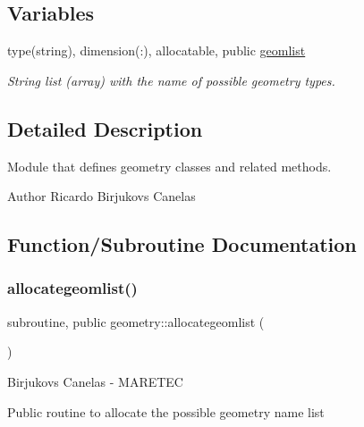 \subsection*{Variables}
\begin{DoxyCompactItemize}
\item 
type(string), dimension(\+:), allocatable, public \hyperlink{namespacegeometry_a879bd9ccab6fc42f051bbfc9f0560a62}{geomlist}
\begin{DoxyCompactList}\small\item\em String list (array) with the name of possible geometry types. \end{DoxyCompactList}\end{DoxyCompactItemize}


\subsection{Detailed Description}
Module that defines geometry classes and related methods. 

\begin{DoxyAuthor}{Author}
Ricardo Birjukovs Canelas 
\end{DoxyAuthor}


\subsection{Function/\+Subroutine Documentation}
\mbox{\label{namespacegeometry_a17652db20fde3f883b4fc778e0e6cdda}} 
\subsubsection{\texorpdfstring{allocategeomlist()}{allocategeomlist()}}
{\footnotesize\ttfamily subroutine, public geometry\+::allocategeomlist (\begin{DoxyParamCaption}{ }\end{DoxyParamCaption})}



Birjukovs Canelas -\/ M\+A\+R\+E\+T\+EC 

Public routine to allocate the possible geometry name list \mbox{\label{namespacegeometry_ab7f40c137db819829d3110dac77a2977}} 
